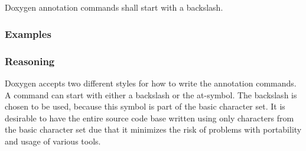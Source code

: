 \subsection*{\doxygenRule{}}

Doxygen annotation commands shall start with a backslash.

\subsubsection*{Examples}

\noindent
\begin{minipage}[t]{0.47\textwidth}
    
\end{minipage}\hfill
\begin{minipage}[t]{0.47\textwidth}
    
\end{minipage}


\subsubsection*{Reasoning}

Doxygen accepts two different styles for how to write the annotation commands. A command can start with either a backslash or the at-symbol.
The backslash is chosen to be used, because this symbol is part of the basic character set. It is desirable to have the entire source code base written using only characters from the basic character set due that it minimizes the risk of problems with portability and usage of various tools.
